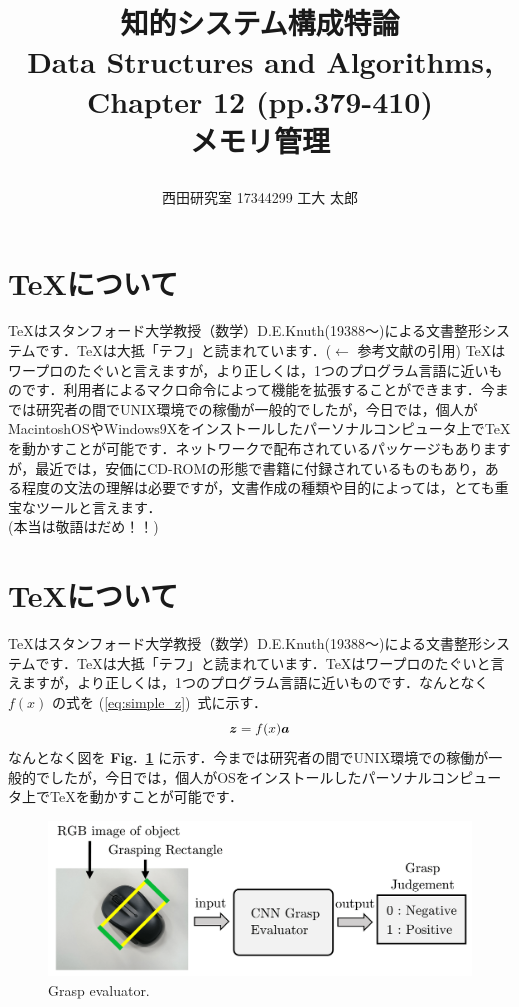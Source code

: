 \documentclass[twocolumn,10pt]{jarticle}
\title{\vspace{-20truemm}
{\normalsize \rightline{平成29年\ 5月\ 20日}}  %
{\large 知的システム構成特論\\} %
{\large Data Structures and Algorithms, %
Chapter 12 (pp.379-410)\\} %
メモリ管理 %
\date{}
\vspace{-2truemm}}
\author{西田研究室 17344299 工大 太郎} %
\begin{document}
\twocolumn[\maketitle]
\section{\TeX について}
TeXはスタンフォード大学教授（数学）D.E.Knuth(19388～)による文書整形システムです．TeXは大抵「テフ」と読まれています\cite{text_nn}．($\leftarrow$ 参考文献の引用) TeXはワープロのたぐいと言えますが，より正しくは，1つのプログラム言語に近いものです．利用者によるマクロ命令によって機能を拡張することができます．今までは研究者の間でUNIX環境での稼働が一般的でしたが，今日では，個人がMacintoshOSやWindows9Xをインストールしたパーソナルコンピュータ上でTeXを動かすことが可能です．ネットワークで配布されているパッケージもありますが，最近では，安価にCD-ROMの形態で書籍に付録されているものもあり，ある程度の文法の理解は必要ですが，文書作成の種類や目的によっては，とても重宝なツールと言えます．
\\(本当は敬語はだめ！！)
\section{\TeX について}
TeXはスタンフォード大学教授（数学）D.E.Knuth(19388～)による文書整形システムです．TeXは大抵「テフ」と読まれています．TeXはワープロのたぐいと言えますが，より正しくは，1つのプログラム言語に近いものです．なんとなく $f(x)$ の式を (\ref{eq:simple_z})~式に示す．
\begin{equation}
\mbox{\boldmath{$z$}} = f(x)\mbox{\boldmath{$a$}}
\label{eq:simple_z}
\end{equation}
なんとなく図を {\bf Fig.~\ref{fig:grasp_evaluator}} に示す．今までは研究者の間でUNIX環境での稼働が一般的でしたが，今日では，個人がOSをインストールしたパーソナルコンピュータ上でTeXを動かすことが可能です．
\vspace{10mm}
\begin{figure}[H]
\centering
  \includegraphics[scale=0.08]{../figures/evaluator.png}
\caption{Grasp evaluator.}
\label{fig:grasp_evaluator}
\end{figure}
\end{document}
